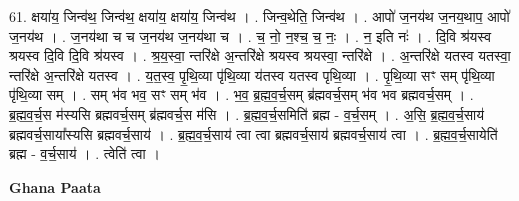 \documentclass[17pt]{extarticle}
\begin{document}
61. क्षया॑य॒ जिन्व॑थ॒ जिन्व॑थ॒ क्षया॑य॒ क्षया॑य॒ जिन्व॑थ । . जिन्व॒थेति॒ जिन्व॑थ । . आपो॑ ज॒नय॑थ ज॒नय॒थाप॒ आपो॑ ज॒नय॑थ । . ज॒नय॑था च च ज॒नय॑थ ज॒नय॑था च । . च॒ नो॒ न॒श्च॒ च॒ नः॒ । . न॒ इति नः॑ । . दि॒वि श्र॑यस्व श्रयस्व दि॒वि दि॒वि श्र॑यस्व । . श्र॒य॒स्वा॒ न्तरि॑क्षे अ॒न्तरि॑क्षे श्रयस्व श्रयस्वा॒ न्तरि॑क्षे । . अ॒न्तरि॑क्षे यतस्व यतस्वा॒ न्तरि॑क्षे अ॒न्तरि॑क्षे यतस्व । . य॒त॒स्व॒ पृ॒थि॒व्या पृ॑थि॒व्या य॑तस्व यतस्व पृथि॒व्या । . पृ॒थि॒व्या सꣳ सम् पृ॑थि॒व्या पृ॑थि॒व्या सम् । . सम् भ॑व भव॒ सꣳ सम् भ॑व । . भ॒व॒ ब्र॒ह्म॒व॒र्च॒सम् ब्र॑ह्मवर्च॒सम् भ॑व भव ब्रह्मवर्च॒सम् । . ब्र॒ह्म॒व॒र्च॒स म॑स्यसि ब्रह्मवर्च॒सम् ब्र॑ह्मवर्च॒स म॑सि । . ब्र॒ह्म॒व॒र्च॒समिति॑ ब्रह्म - व॒र्च॒सम् । . अ॒सि॒ ब्र॒ह्म॒व॒र्च॒साय॑ ब्रह्मवर्च॒साया᳚स्यसि ब्रह्मवर्च॒साय॑ । . ब्र॒ह्म॒व॒र्च॒साय॑ त्वा त्वा ब्रह्मवर्च॒साय॑ ब्रह्मवर्च॒साय॑ त्वा । . ब्र॒ह्म॒व॒र्च॒सायेति॑ ब्रह्म - व॒र्च॒साय॑ । . त्वेति॑ त्वा । \newline

\textbf{Ghana Paata } \newline
\end{document}
